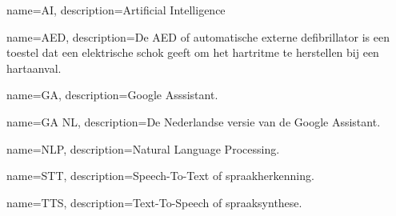 \documentclass[fleqn,a4paper,12pt]{book}
\begin{document}


\inserttitlepage

\usechapterimagefalse



\pagestyle{empty} %
\tableofcontents %
\cleardoublepage %
\pagestyle{fancy} %


%
\listoffigures
\listoftables


{
    name=AI,
    description={Artificial Intelligence}
}

{
    name=AED,
    description={De AED of automatische externe defibrillator is een toestel dat een elektrische schok geeft om het hartritme te herstellen bij een hartaanval.}
}

{
    name=GA,
    description={Google Asssistant.}
}

{
    name=GA NL,
    description={De Nederlandse versie van de Google Assistant.}
}

{
    name=NLP,
    description={Natural Language Processing.}
}

{
    name=STT,
    description={Speech-To-Text of spraakherkenning.}
}

{
    name=TTS,
    description={Text-To-Speech of spraaksynthese.}
}
\end{document}
